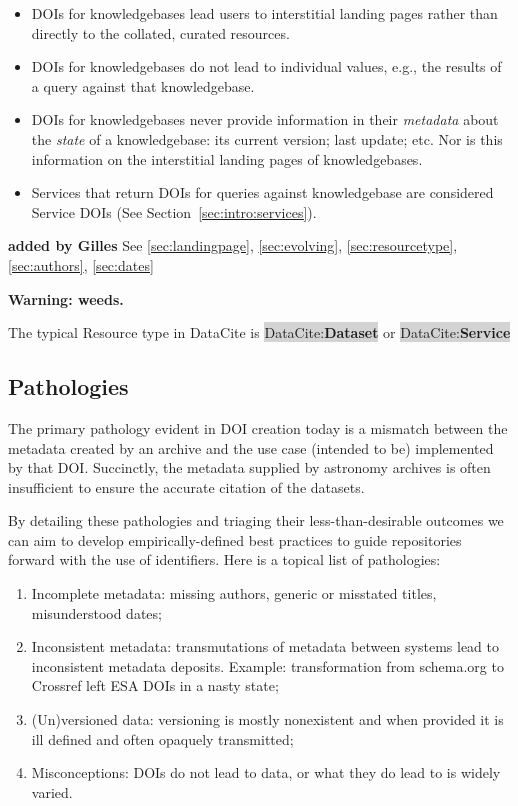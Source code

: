 \documentclass[11pt,a4paper]{ivoa}
\newcommand{\dataciteterm}[1]{\colorbox{lightgray}{DataCite:\textbf{#1}}}
\begin{document}
\begin{itemize}
	\item DOIs for knowledgebases lead users to interstitial landing pages rather than directly to the collated, curated resources. 
	\item DOIs for knowledgebases do not lead to individual values, e.g., the results of a query against that knowledgebase.
	\item DOIs for knowledgebases never provide information in their \textit{metadata} about the \textit{state} of a knowledgebase: its current version; last update; etc. 
	Nor is this information on the interstitial landing pages of knowledgebases.
	\item Services that return DOIs for queries against knowledgebase are considered Service DOIs (See Section~\ref{sec:intro:services}).
\end{itemize}

\textbf{\color{red} added by Gilles}
See \ref{sec:landingpage}, \ref{sec:evolving}, \ref{sec:resourcetype}, \ref{sec:authors}, \ref{sec:dates}

\textbf{Warning: weeds.}

The typical Resource type in DataCite is \dataciteterm{Dataset} or \dataciteterm{Service}

\subsection{Pathologies}
\label{sec:use:patho}

The primary pathology evident in DOI creation today is a mismatch between the metadata created by an archive and the use case (intended to be) implemented by that DOI. 
Succinctly, the metadata supplied by astronomy archives is often insufficient to ensure the accurate citation of the datasets.

By detailing these pathologies and triaging their less-than-desirable outcomes we can aim to develop empirically-defined best practices to guide repositories forward with the use of identifiers.
Here is a topical list of pathologies:

\begin{enumerate}
	\item Incomplete metadata: missing authors, generic or misstated titles, misunderstood dates;
	\item Inconsistent metadata: transmutations of metadata between systems lead to inconsistent metadata deposits. Example: transformation from schema.org to Crossref left ESA DOIs in a nasty state;
	\item (Un)versioned data: versioning is mostly nonexistent and when provided it is ill defined and often opaquely transmitted;
	\item Misconceptions: DOIs do not lead to data, or what they do lead to is widely varied.
\end{enumerate}
\end{document}

